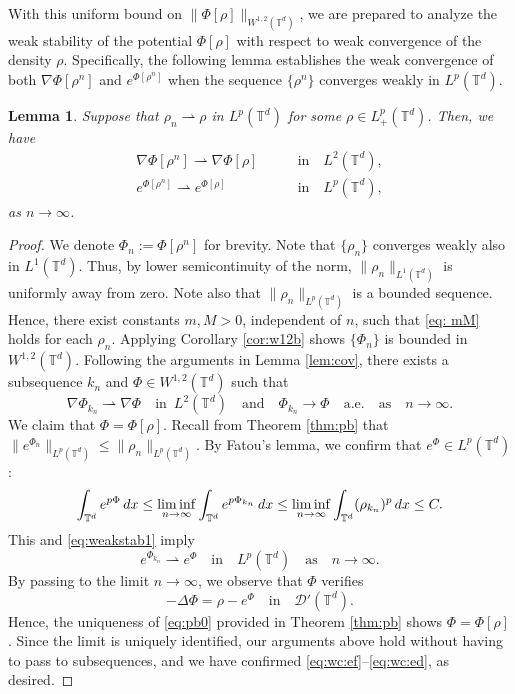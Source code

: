 \documentclass[11pt,reqno,a4paper]{amsart}
\newcommand{\intt}{\int_{\T^d}}
\newtheorem{lemma}{Lemma}[section]
\theoremstyle{definition}
\theoremstyle{remark}
\numberwithin{equation}{section}
\newcommand{\T} {\mathbb T}
\newcommand{\calD}{\mathcal D}
\newcommand{\weakto}{\rightharpoonup}
\newcommand{\dx}{\textnormal{d}x}
\begin{document}
With this uniform bound on $\|\Phi[\rho]\|_{W^{1,2}(\T^d)}$, we are prepared to analyze the weak stability of the potential $\Phi[\rho]$ with respect to weak convergence of the density $\rho$. Specifically, the following lemma establishes the weak convergence of both $\nabla\Phi[\rho^n]$ and $e^{\Phi[\rho^n]}$ when the sequence $\{\rho^n\}$ converges weakly in $L^p(\T^d)$.

\begin{lemma}\label{lem:wst}
Suppose that $\rho_n \weakto \rho$ in $L^p(\T^d)$ for some $\rho \in L^p_+(\T^d)$. Then, we have
\begin{align}
\nabla\Phi[\rho^n] \weakto \nabla \Phi[\rho] \qquad &\mbox{in} \quad    L^2(\T^d), \label{eq:wc:ef}\\
e^{\Phi[\rho^n]} \weakto e^{\Phi[\rho]}  \qquad &\mbox{in} \quad  L^p (\T^d), \label{eq:wc:ed}
\end{align}
as $n \to \infty$.
\end{lemma}
\begin{proof}
We denote $\Phi_n:=\Phi[\rho^n]$ for brevity. Note that $\{\rho_n\}$ converges weakly also in $L^1(\T^d)$. Thus, by lower semicontinuity of the norm, $\|\rho_n\|_{L^1(\T^d)}$ is uniformly away from zero. Note also that $\|\rho_n\|_{L^p(\T^d)}$ is a bounded sequence. Hence, there exist constants $m,M>0$, independent of $n$, such that \eqref{eq: mM} holds for each $\rho_n$. Applying Corollary \ref{cor:w12b} shows $\{\Phi_n\}$ is bounded in $W^{1,2}(\T^d)$. Following the arguments in Lemma \ref{lem:cov}, there exists a subsequence $k_n$ and $\Phi \in W^{1,2}(\T^d)$ such that 
\begin{equation}
\label{eq:weakstab1}
\nabla \Phi_{k_n} \weakto \nabla \Phi\quad \mbox{in} \,\,\, L^2(\T^d)\quad \mbox{and} \quad \Phi_{k_n} \to \Phi \quad \text{a.e.} \quad \mbox{as} \quad n \to \infty.
\end{equation}
We claim that $\Phi = \Phi[\rho]$. Recall from Theorem \ref{thm:pb} that $\|e^{\Phi_n}\|_{L^p(\T^d)}\le \|\rho_n\|_{L^p(\T^d)}$. By Fatou's lemma, we confirm that $e^\Phi \in L^p(\T^d)$:
\[
\intt e^{p\Phi} \,\dx \le \liminf_{n \to \infty} \intt e^{p\Phi_{k_n}} \,\dx \le \liminf_{n \to \infty} \intt (\rho_{k_n})^p \,\dx \le C.
\]
This and \eqref{eq:weakstab1} imply
\[
e^{\Phi_{k_n}} \weakto e^{\Phi}  \quad\text{in}\quad L^p (\T^d) \quad \mbox{as} \quad n \to \infty.
\]
By passing to the limit $n \to \infty$, we observe that $\Phi$ verifies
\[
-\Delta \Phi = \rho - e^{\Phi} \quad\text{in}\quad \calD'(\T^d).
\]
Hence, the uniqueness of \eqref{eq:pb0} provided in Theorem \ref{thm:pb} shows $\Phi = \Phi[\rho]$. Since the limit is uniquely identified, our arguments above hold without having to pass to subsequences, and we have confirmed \eqref{eq:wc:ef}--\eqref{eq:wc:ed}, as desired.
\end{proof}
\end{document}
